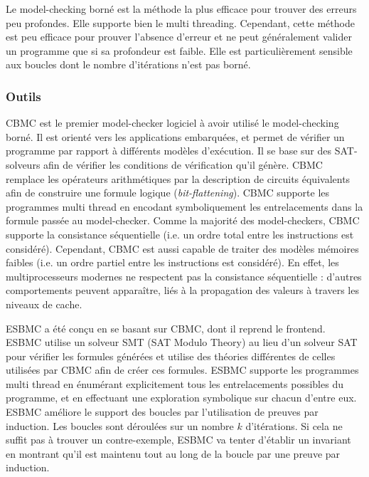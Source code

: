 Le model-checking borné est la méthode la plus efficace pour trouver des
erreurs peu profondes. Elle supporte bien le multi threading. Cependant,
cette méthode est peu efficace pour prouver l'absence d'erreur et ne
peut généralement valider un programme que si sa profondeur est faible.
Elle est particulièrement sensible aux boucles dont le nombre
d'itérations n'est pas borné.

\subsubsection{Outils}

CBMC\cite{CBMC} est le premier model-checker logiciel à avoir utilisé le
model-checking borné. Il est orienté vers les applications embarquées, et permet
de vérifier un programme par rapport à différents modèles d'exécution. Il se
base sur des SAT-solveurs afin de vérifier les conditions de vérification qu'il
génère. CBMC remplace les opérateurs arithmétiques par la description de
circuits équivalents afin de construire une formule logique
(\emph{bit-flattening}). CBMC supporte les programmes multi thread en encodant
symboliquement les entrelacements dans la formule passée au model-checker. Comme
la majorité des model-checkers, CBMC supporte la consistance séquentielle (i.e.
un ordre total entre les instructions est considéré). Cependant, CBMC est aussi
capable de traiter des modèles mémoires faibles (i.e. un ordre partiel entre les
instructions est considéré). En effet, les multiprocesseurs modernes ne
respectent pas la consistance séquentielle : d'autres comportements peuvent
apparaître, liés à la propagation des valeurs à travers les niveaux de cache.

ESBMC\cite{ESBMC} a été conçu en se basant sur CBMC, dont il reprend le
frontend. ESBMC utilise un solveur SMT (SAT Modulo Theory) au lieu d'un solveur
SAT pour vérifier les formules générées et utilise des théories différentes de
celles utilisées par CBMC afin de créer ces formules. ESBMC supporte les
programmes multi thread en énumérant explicitement tous les entrelacements
possibles du programme, et en effectuant une exploration symbolique sur chacun
d'entre eux. ESBMC améliore le support des boucles par l'utilisation de preuves
par induction\cite{ESBMC_k_induction}. Les boucles sont déroulées sur un nombre
\(k\) d'itérations. Si cela ne suffit pas à trouver un contre-exemple, ESBMC va
tenter d'établir un invariant en montrant qu'il est maintenu tout au long de la
boucle par une preuve par induction.

